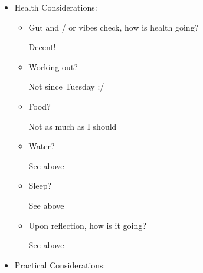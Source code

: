\documentclass[12pt]{article}
\renewcommand{\,}{\textsuperscript{,}}
\begin{document}
\begin{itemize}
\begin{itemize}
\begin{itemize}
\item How's outreach going?

Nonexistent

\item How goes prep for the rest of your life?

Nonexistent

\item How goes prep / submission of workshops?

I learned I can!

\item Any talks coming?

Nonexistent

\item Upon reflection, how goes outreach? Anything missed in those three questions?

Nonexistant

\end{itemize}

\item Upon reflection, how is creation going?

Generally well!

\end{itemize}

\item Health Considerations:

\begin{itemize}

\item Gut and / or vibes check, how is health going?

Decent!

\item Working out?

Not since Tuesday :/

\item Food?

Not as much as I should

\item Water?

See above

\item Sleep?

See above

\item Upon reflection, how is it going?

See above

\end{itemize}

\item Practical Considerations:


\end{itemize}
\end{document}
